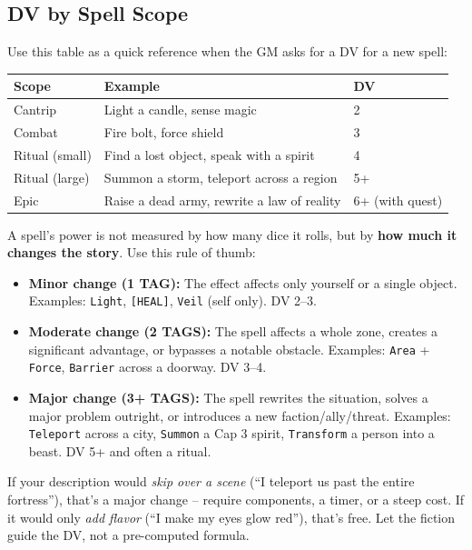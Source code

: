 \subsection{DV by Spell Scope}
\label{sec:dv-spell-scope}
Use this table as a quick reference when the GM asks for a DV for a new spell:

\begin{center}
\begin{tabular}{lll}
\toprule
\textbf{Scope} & \textbf{Example} & \textbf{DV} \\
\midrule
Cantrip & Light a candle, sense magic & 2 \\
Combat & Fire bolt, force shield & 3 \\
Ritual (small) & Find a lost object, speak with a spirit & 4 \\
Ritual (large) & Summon a storm, teleport across a region & 5+ \\
Epic & Raise a dead army, rewrite a law of reality & 6+ (with quest) \\
\bottomrule
\end{tabular}
\end{center}

\begin{tcolorbox}[colback=yellow!5!white,colframe=yellow!75!black,title=When in Doubt, Measure Tags by Narrative Impact,breakable]
A spell's power is not measured by how many dice it rolls, but by \textbf{how much it changes the story}. Use this rule of thumb:

\begin{itemize}
  \item \textbf{Minor change (1 TAG):} The effect affects only yourself or a single object. Examples: \texttt{Light}, \texttt{[HEAL]}, \texttt{Veil} (self only). DV 2--3.
  \item \textbf{Moderate change (2 TAGS):} The spell affects a whole zone, creates a significant advantage, or bypasses a notable obstacle. Examples: \texttt{Area} + \texttt{Force}, \texttt{Barrier} across a doorway. DV 3--4.
  \item \textbf{Major change (3+ TAGS):} The spell rewrites the situation, solves a major problem outright, or introduces a new faction/ally/threat. Examples: \texttt{Teleport} across a city, \texttt{Summon} a Cap 3 spirit, \texttt{Transform} a person into a beast. DV 5+ and often a ritual.
\end{itemize}
If your description would \emph{skip over a scene} (``I teleport us past the entire fortress''), that's a major change -- require components, a timer, or a steep cost. If it would only \emph{add flavor} (``I make my eyes glow red''), that's free. Let the fiction guide the DV, not a pre-computed formula.
\end{tcolorbox}

